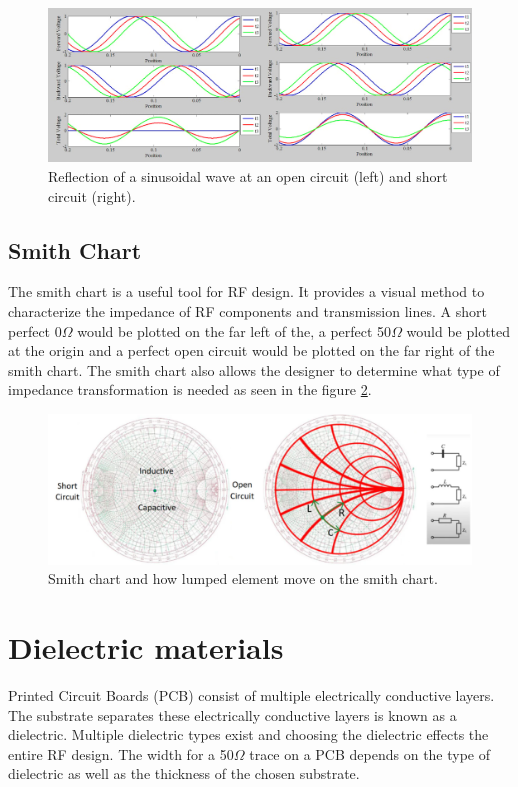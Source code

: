     \begin{figure}[H]
    \centering
    \includegraphics[width=0.9\linewidth]{Figures/chp2_sinwave_reflection.png}
    \caption{Reflection of a sinusoidal wave at an open circuit (left) and short circuit (right).}
    \label{fig:chp2_sinwave_reflection}
    \end{figure}

\subsection{Smith Chart}
The smith chart is a useful tool for RF design. It provides a visual method to characterize the impedance of RF components and transmission lines. A short perfect 0$\Omega$ would be plotted on the far left of the, a perfect 50$\Omega$ would be plotted at the origin and a perfect open circuit would be plotted on the far right of the smith chart.  The smith chart also allows the designer to determine what type of impedance transformation is needed as seen in the figure \ref{fig:chp2_smithchart}.

    \begin{figure}[H]
    \centering
    \includegraphics[width=0.8\linewidth]{Figures/chp2_smithchart.png}
    \caption{Smith chart and how lumped element move on the smith chart.}
    \label{fig:chp2_smithchart}
    \end{figure}

\section{Dielectric materials}
Printed Circuit Boards (PCB) consist of multiple electrically conductive layers. The substrate separates these electrically conductive layers is known as a dielectric. Multiple dielectric types exist and choosing the dielectric effects the entire RF design. The width for a 50$\Omega$ trace on a PCB depends on the type of dielectric as well as the thickness of the chosen substrate.

